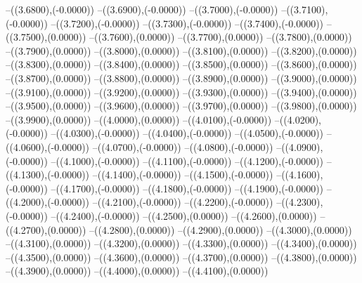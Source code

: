 {	--({\sx*(3.6800)},{\sy*(-0.0000)})
	--({\sx*(3.6900)},{\sy*(-0.0000)})
	--({\sx*(3.7000)},{\sy*(-0.0000)})
	--({\sx*(3.7100)},{\sy*(-0.0000)})
	--({\sx*(3.7200)},{\sy*(-0.0000)})
	--({\sx*(3.7300)},{\sy*(-0.0000)})
	--({\sx*(3.7400)},{\sy*(-0.0000)})
	--({\sx*(3.7500)},{\sy*(0.0000)})
	--({\sx*(3.7600)},{\sy*(0.0000)})
	--({\sx*(3.7700)},{\sy*(0.0000)})
	--({\sx*(3.7800)},{\sy*(0.0000)})
	--({\sx*(3.7900)},{\sy*(0.0000)})
	--({\sx*(3.8000)},{\sy*(0.0000)})
	--({\sx*(3.8100)},{\sy*(0.0000)})
	--({\sx*(3.8200)},{\sy*(0.0000)})
	--({\sx*(3.8300)},{\sy*(0.0000)})
	--({\sx*(3.8400)},{\sy*(0.0000)})
	--({\sx*(3.8500)},{\sy*(0.0000)})
	--({\sx*(3.8600)},{\sy*(0.0000)})
	--({\sx*(3.8700)},{\sy*(0.0000)})
	--({\sx*(3.8800)},{\sy*(0.0000)})
	--({\sx*(3.8900)},{\sy*(0.0000)})
	--({\sx*(3.9000)},{\sy*(0.0000)})
	--({\sx*(3.9100)},{\sy*(0.0000)})
	--({\sx*(3.9200)},{\sy*(0.0000)})
	--({\sx*(3.9300)},{\sy*(0.0000)})
	--({\sx*(3.9400)},{\sy*(0.0000)})
	--({\sx*(3.9500)},{\sy*(0.0000)})
	--({\sx*(3.9600)},{\sy*(0.0000)})
	--({\sx*(3.9700)},{\sy*(0.0000)})
	--({\sx*(3.9800)},{\sy*(0.0000)})
	--({\sx*(3.9900)},{\sy*(0.0000)})
	--({\sx*(4.0000)},{\sy*(0.0000)})
	--({\sx*(4.0100)},{\sy*(-0.0000)})
	--({\sx*(4.0200)},{\sy*(-0.0000)})
	--({\sx*(4.0300)},{\sy*(-0.0000)})
	--({\sx*(4.0400)},{\sy*(-0.0000)})
	--({\sx*(4.0500)},{\sy*(-0.0000)})
	--({\sx*(4.0600)},{\sy*(-0.0000)})
	--({\sx*(4.0700)},{\sy*(-0.0000)})
	--({\sx*(4.0800)},{\sy*(-0.0000)})
	--({\sx*(4.0900)},{\sy*(-0.0000)})
	--({\sx*(4.1000)},{\sy*(-0.0000)})
	--({\sx*(4.1100)},{\sy*(-0.0000)})
	--({\sx*(4.1200)},{\sy*(-0.0000)})
	--({\sx*(4.1300)},{\sy*(-0.0000)})
	--({\sx*(4.1400)},{\sy*(-0.0000)})
	--({\sx*(4.1500)},{\sy*(-0.0000)})
	--({\sx*(4.1600)},{\sy*(-0.0000)})
	--({\sx*(4.1700)},{\sy*(-0.0000)})
	--({\sx*(4.1800)},{\sy*(-0.0000)})
	--({\sx*(4.1900)},{\sy*(-0.0000)})
	--({\sx*(4.2000)},{\sy*(-0.0000)})
	--({\sx*(4.2100)},{\sy*(-0.0000)})
	--({\sx*(4.2200)},{\sy*(-0.0000)})
	--({\sx*(4.2300)},{\sy*(-0.0000)})
	--({\sx*(4.2400)},{\sy*(-0.0000)})
	--({\sx*(4.2500)},{\sy*(0.0000)})
	--({\sx*(4.2600)},{\sy*(0.0000)})
	--({\sx*(4.2700)},{\sy*(0.0000)})
	--({\sx*(4.2800)},{\sy*(0.0000)})
	--({\sx*(4.2900)},{\sy*(0.0000)})
	--({\sx*(4.3000)},{\sy*(0.0000)})
	--({\sx*(4.3100)},{\sy*(0.0000)})
	--({\sx*(4.3200)},{\sy*(0.0000)})
	--({\sx*(4.3300)},{\sy*(0.0000)})
	--({\sx*(4.3400)},{\sy*(0.0000)})
	--({\sx*(4.3500)},{\sy*(0.0000)})
	--({\sx*(4.3600)},{\sy*(0.0000)})
	--({\sx*(4.3700)},{\sy*(0.0000)})
	--({\sx*(4.3800)},{\sy*(0.0000)})
	--({\sx*(4.3900)},{\sy*(0.0000)})
	--({\sx*(4.4000)},{\sy*(0.0000)})
	--({\sx*(4.4100)},{\sy*(0.0000)})
}
